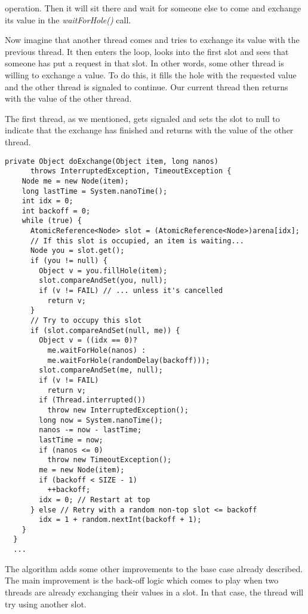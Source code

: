 operation. Then it will sit there and wait for someone else to come and exchange
its value in the \textit{waitForHole()} call.
\par
Now imagine that another thread comes and tries to exchange its value with the
previous thread. It then enters the loop, looks into the first slot and sees
that someone has put a request in that slot. In other words, some other thread
is willing to exchange a value. To do this, it fills the hole with the requested
value and the other thread is signaled to continue. Our current thread then
returns with the value of the other thread.
\par
The first thread, as we mentioned, gets signaled and sets the slot to null to
indicate that the exchange has finished and returns with the value of the other
thread. 
\par
\hfill
\begin{lstlisting}[style=numbers]
  private Object doExchange(Object item, long nanos)
      throws InterruptedException, TimeoutException {
    Node me = new Node(item);
    long lastTime = System.nanoTime();
    int idx = 0;
    int backoff = 0;
    while (true) {
      AtomicReference<Node> slot = (AtomicReference<Node>)arena[idx];
      // If this slot is occupied, an item is waiting...
      Node you = slot.get();
      if (you != null) {
        Object v = you.fillHole(item);
        slot.compareAndSet(you, null);
        if (v != FAIL) // ... unless it's cancelled
          return v;
      }
      // Try to occupy this slot
      if (slot.compareAndSet(null, me)) {
        Object v = ((idx == 0)?
          me.waitForHole(nanos) :
          me.waitForHole(randomDelay(backoff)));
        slot.compareAndSet(me, null);
        if (v != FAIL)
          return v;
        if (Thread.interrupted())
          throw new InterruptedException();
        long now = System.nanoTime();
        nanos -= now - lastTime;
        lastTime = now;
        if (nanos <= 0)
          throw new TimeoutException();
        me = new Node(item);
        if (backoff < SIZE - 1)
          ++backoff;
        idx = 0; // Restart at top
      } else // Retry with a random non-top slot <= backoff
        idx = 1 + random.nextInt(backoff + 1);
    }
  }
  ...
\end{lstlisting}
\hfill
\par
The algorithm adds some other improvements to the base case already described.
The main improvement is the back-off logic which comes to play when two threads
are already exchanging their values in a slot. In that case, the thread will try
using another slot.
